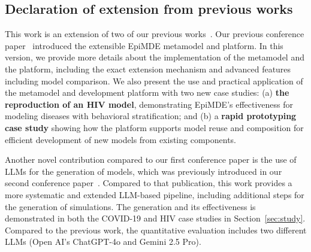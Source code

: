 \subsection{Declaration of extension from previous works}

This work is an extension of two of our previous works~\cite{curzi2024epimde, karamchandani2025requirements}. Our previous conference paper~\cite{curzi2024epimde} introduced the extensible EpiMDE metamodel and platform. In this version, we provide more details about the implementation of the metamodel and the platform, including the exact extension mechanism and advanced features including model comparison. We also present the use and practical application of the metamodel and development platform with two new case studies: (a) \textbf{the reproduction of an HIV model}, demonstrating EpiMDE's effectiveness for modeling diseases with behavioral stratification; and (b) a \textbf{rapid prototyping case study} showing how the platform supports model reuse and composition for efficient development of new models from existing components. 

Another novel contribution compared to our first conference paper is the use of LLMs for the generation of models, which was previously introduced in our second conference paper~\cite{karamchandani2025requirements}. Compared to that publication, this work provides a more systematic and extended LLM-based pipeline, including additional steps for the generation of simulations. The generation and its effectiveness is demonstrated in both the COVID-19 and HIV case studies in Section~\ref{sec:study}. Compared to the previous work, the quantitative evaluation includes two different LLMs (Open AI's ChatGPT-4o and Gemini 2.5 Pro).